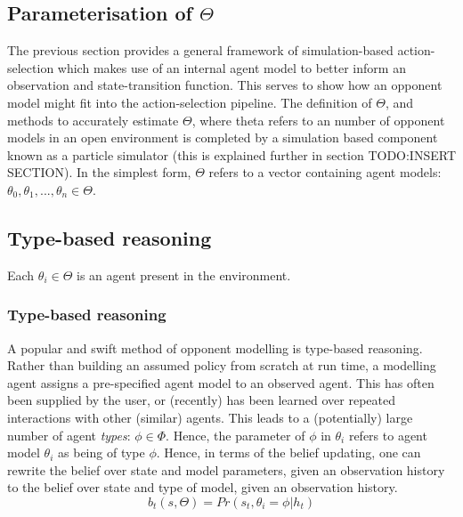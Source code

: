 \subsection{Parameterisation of $\Theta$}
The previous section provides a general framework of simulation-based action-selection which makes use of an internal agent model to better inform an observation and state-transition function. This serves to show how an opponent model might fit into the action-selection pipeline.
\newline \newline
The definition of $\Theta$, and methods to accurately estimate $\Theta$, where theta refers to an number of opponent models in an open environment is completed by a simulation based component known as a particle simulator (this is explained further in section TODO:INSERT SECTION).
\newline\newline
In the simplest form, $\Theta$ refers to a vector containing agent models: ${\theta_0, \theta_1,...,\theta_n} \in \Theta$. 
\subsection{Type-based reasoning}
Each $\theta_i \in \Theta$ is an agent present in the environment.    
\subsubsection{Type-based reasoning}
A popular and swift method of opponent modelling is type-based reasoning. Rather than building an assumed policy from scratch at run time, a modelling agent assigns a pre-specified agent model to an observed agent. This has often been supplied by the user, or (recently) has been learned over repeated interactions with other (similar) agents. 
This leads to a (potentially) large number of agent \textit{types}: $\phi \in \Phi$.
\newline \newline
Hence, the parameter of $\phi$ in $\theta_i$ refers to agent model $\theta_i$ as being of type $\phi$. 
\newline \newline
Hence, in terms of the belief updating, one can rewrite the belief over state and model parameters, given an observation history to the belief over state and type of model, given an observation history. 
\begin{equation}
    b_t(s,\Theta) = Pr(s_t,\theta_i = \phi | h_t)
\end{equation}




